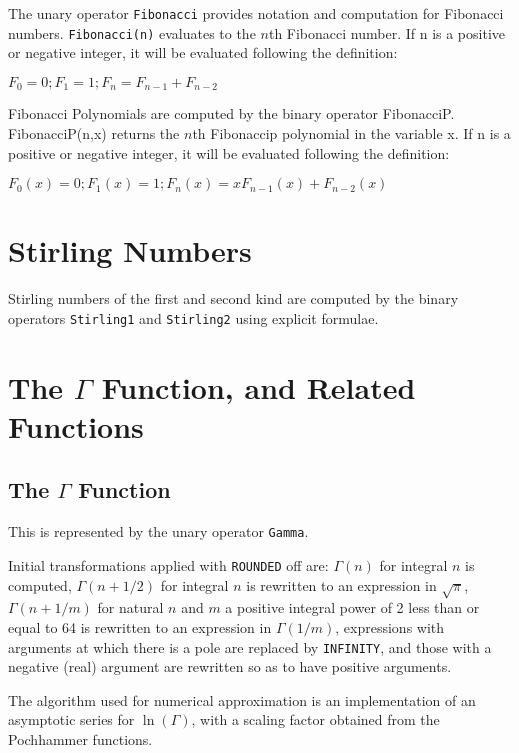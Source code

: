 \documentclass[11pt]{article}
\begin{document}
The unary operator {\tt Fibonacci} provides notation and computation for
Fibonacci numbers.  {\tt Fibonacci(n)} evaluates to the $n$th Fibonacci
number. If n is a positive or negative integer, it will be evaluated following
the definition:

$F_0 = 0 ; F_1 = 1 ; F_n = F_{n-1} + F_{n-2} $

Fibonacci Polynomials are computed by the binary operator 
FibonacciP. FibonacciP(n,x) returns the $n$th Fibonaccip polynomial
in the variable x. If n is a positive or negative integer, it will be evaluated following
the definition:

$F_0(x) = 0 ; F_1(x) = 1 ; F_n(x) = x F_{n-1}(x) + F_{n-2}(x) $


\section{Stirling Numbers}
Stirling numbers of the first and second kind are computed 
by the binary operators {\tt Stirling1} and {\tt Stirling2}
using explicit formulae.


\section{The \texorpdfstring{$\Gamma$}{Gamma} Function, and Related Functions}

\subsection{The  \texorpdfstring{$\Gamma$}{Gamma} Function}

This is represented by the unary operator {\tt Gamma}.

Initial transformations applied with {\tt ROUNDED} off are: $\Gamma(n)$ for
integral $n$ is computed, $\Gamma(n+1/2)$ for integral $n$ is rewritten to
an expression in $\sqrt\pi$, $\Gamma(n+1/m)$ for natural $n$ and $m$ a
positive integral power of 2 less than or equal to 64 is rewritten to an
expression in $\Gamma(1/m)$, expressions with arguments at which there is a
pole are replaced by {\tt INFINITY}, and those with a negative (real)
argument are rewritten so as to have positive arguments.

The algorithm used for numerical approximation is an implementation of an
asymptotic series for $\ln(\Gamma)$, with a scaling factor obtained from
the Pochhammer functions.
\end{document}
